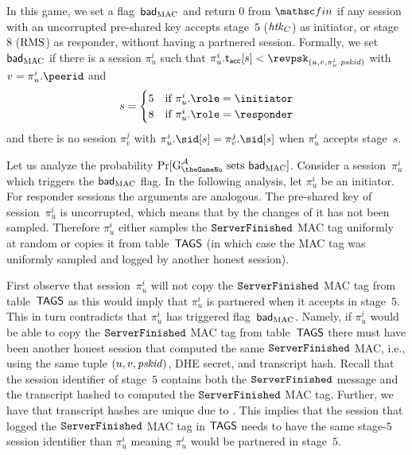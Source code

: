 	In this game, we set a flag~$\mathsf{bad}_{\mathrm{MAC}}$ and return $0$ from $\Finalize$ if any session with an uncorrupted pre-shared key accepts stage~$5$ ($\mathit{htk}_C$) as initiator, or stage~$8$ ($\mathrm{RMS}$) as responder, without having a partnered session.
	Formally, we set $\mathsf{bad}_{\mathrm{MAC}}$ if there is a session $\pi_u^i$ such that $\pi_u^i.\taccepted[s] < \revpsk_{(u,v,\pi_u^i.\pskid)}$ with $v = \pi_u^i.\peerid$ and 
	\[
	s = \begin{cases}
		5 & \mbox{if } \pi_u^i.\role = \initiator \\
		8 & \mbox{if } \pi_u^i.\role = \responder
	\end{cases}
	\]
	and there is no session $\pi_v^j$ with $\pi_u^i.\sid[s] = \pi_v^j.\sid[s]$ when $\pi_u^i$ accepts stage~$s$.
	
	Let us analyze the probability $\Pr[ \thisGameMath \text{ sets } \bad_\mathrm{MAC}]$.
	Consider a session~$\pi_u^i$ which triggers the $\mathsf{bad}_{\mathrm{MAC}}$ flag. 
	In the following analysis, let $\pi_u^i$ be an initiator.
	For responder sessions the arguments are analogous.
	The pre-shared key of session~$\pi_u^i$ is uncorrupted, which means that by the changes of  it has not been sampled. 
	Therefore $\pi_u^i$ either samples the $\mathtt{ServerFinished}$ MAC tag uniformly at random or copies it from table~$\mathsf{TAGS}$ (in which case the MAC tag was uniformly sampled and logged by another honest session).
	
	First observe that session~$\pi_u^i$ will not copy the $\mathtt{ServerFinished}$ MAC tag from table~$\mathsf{TAGS}$ as this would imply that $\pi_u^i$ is partnered when it accepts in stage~$5$. 
	This in turn contradicts that $\pi_u^i$ has triggered flag~$\mathsf{bad}_{\mathrm{MAC}}$. 
	Namely, if $\pi_u^i$ would be able to copy the $\mathtt{ServerFinished}$ MAC tag from table~$\mathsf{TAGS}$ there must have been another honest session that computed the same $\mathtt{ServerFinished}$ MAC, i.e., using the same tuple $(u,v,\mathit{pskid})$, DHE secret, and transcript hash. 
	Recall that the session identifier of stage~$5$ contains both the $\mathtt{ServerFinished}$ message and the transcript hashed to computed the $\mathtt{ServerFinished}$ MAC tag. 
	Further, we have that transcript hashes are unique due to . 
	This implies that the session that logged the $\mathtt{ServerFinished}$ MAC tag in $\mathsf{TAGS}$ needs to have the same stage-$5$ session identifier than $\pi_u^i$ meaning $\pi_u^i$ would be partnered in stage~$5$.

